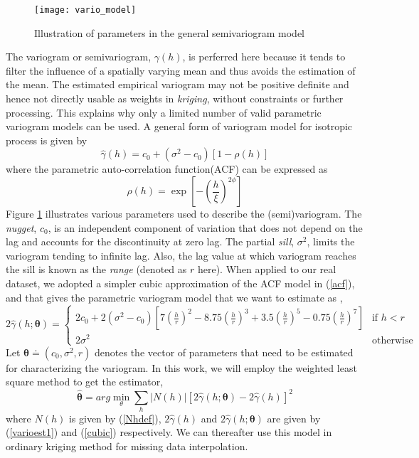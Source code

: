 \documentclass[12pt]{article}
\numberwithin{equation}{section}
\numberwithin{table}{section}
\numberwithin{figure}{section}
\begin{document}
\begin{figure} \centering
  \texttt{[image: vario\_model]}
  \caption{Illustration of parameters in the general semivariogram model}
  \label{vario_model}
\end{figure}


The variogram or semivariogram, $\gamma(h)$, 
is perferred here because it tends to filter the
influence of a spatially varying mean and thus avoids the estimation
of the mean. The estimated empirical variogram may not be positive
definite and hence not directly usable as weights in \emph{kriging}, 
without constraints or further processing. This explains why
only a limited number of valid parametric variogram models can be used.
A general form of variogram model for isotropic process is given by
\begin{equation} \label{variomod}
  \hat{\gamma}(h) = c_0 + (\sigma^2 - c_0)[ 1- \rho(h)]
\end{equation}
where the parametric auto-correlation function(ACF) can be expressed as 
\begin{equation} \label{acf}
  \rho(h) = \exp{ \left[-\left( \frac{h}{\xi} \right)^{2\phi} \right] }
\end{equation}
Figure \ref{vario_model} illustrates various parameters used to
describe the (semi)variogram. The \emph{nugget}, $c_0$, is an 
independent component of variation that does not depend on the lag
and accounts for the discontinuity at zero lag. The partial
\emph{sill}, $\sigma^2$, limits the variogram tending to infinite
lag. Also, the lag value at which variogram reaches the sill is
known as the \emph{range} (denoted as $r$ here). When applied to our
real dataset, we adopted a simpler cubic approximation 
of the ACF model in (\ref{acf}), and that gives the parametric variogram
model that we want to estimate as \cite{geoR},
\begin{equation} \label{cubic}
  2\hat{\gamma}(h;\bm{\theta}) = 
\begin{cases} 
  2c_0 + 2(\sigma^2 - c_0) 
  \left[ 7\left( \frac{h}{r} \right)^2 - 8.75\left( \frac{h}{r} \right)^3
  + 3.5\left( \frac{h}{r}\right)^5 - 0.75\left( \frac{h}{r}\right)^7
  \right] & \mbox{if $h<r$} \\
  2\sigma^2 & \mbox{otherwise}
\end{cases}
\end{equation}
Let $\bm{\theta} \doteq (c_0, \sigma^2, r)$ denotes the vector of
parameters that need to be estimated for characterizing the
variogram. In this work, we will employ the weighted least square method
to get the estimator,
\begin{equation} \label{variowls}
  \hat{\bm{\theta}} = arg\min_{\theta} \sum_h |N(h)|\left[
    2\hat{\gamma}(h; \bm{\theta}) - 2\hat{\gamma}(h) \right]^2
\end{equation}
where $N(h)$ is given by (\ref{Nhdef}), $2\hat{\gamma}(h)$ and
$2\hat{\gamma}(h;\bm{\theta})$ are given by (\ref{varioest1}) and
(\ref{cubic}) respectively. We can thereafter use this model in
ordinary kriging method for missing data interpolation. 
\end{document}
